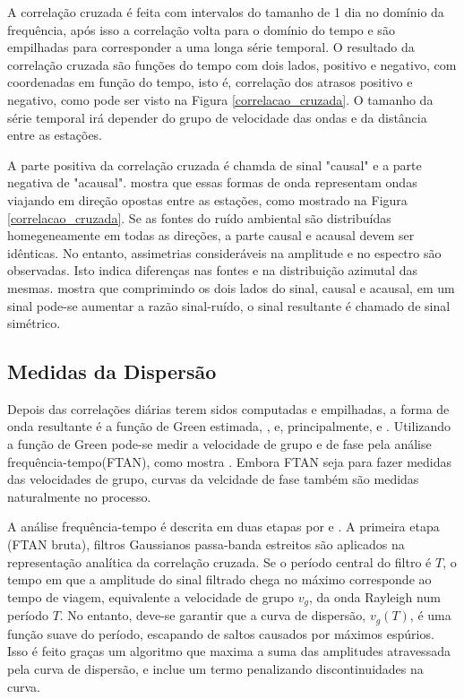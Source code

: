 A correlação cruzada é feita com intervalos do tamanho de 1 dia no domínio da frequência, após isso a correlação volta para o domínio do tempo e são empilhadas para corresponder a uma longa série temporal. 
O resultado da correlação cruzada são funções do tempo com dois lados, positivo e negativo, com coordenadas em função do tempo, isto é, correlação dos atrasos positivo e negativo, como pode ser visto na Figura \ref{correlacao_cruzada}. O tamanho da série temporal irá depender do grupo de velocidade das ondas e da distância entre as estações.

A parte positiva da correlação cruzada é chamda de sinal "causal" e a parte negativa de "acausal". \cite{bensen_processing_2007} mostra que essas formas de onda representam ondas viajando em direção opostas entre as estações, como mostrado na Figura \ref{correlacao_cruzada}. Se as fontes do ruído ambiental são distribuídas homegeneamente em todas as direções, a parte  causal e acausal devem ser idênticas. No entanto, assimetrias consideráveis na amplitude e no espectro são observadas. Isto indica diferenças nas fontes e na distribuição azimutal das mesmas. \cite{bensen_processing_2007} mostra que comprimindo os dois lados do sinal, causal e acausal, em um sinal pode-se aumentar a razão sinal-ruído, o sinal resultante é chamado de sinal simétrico.

\subsection{Medidas da Dispersão}

Depois das correlações diárias terem sidos computadas e empilhadas, a forma de onda resultante é a função de Green estimada, \cite{campillo_long-range_2003}, \cite{shapiro_emergence_2004} e, principalmente, \cite{wapenaar_retrieving_2004} e \cite{bensen_processing_2007}. Utilizando a função de Green pode-se medir a velocidade de grupo e de fase pela análise frequência-tempo(FTAN), como mostra \cite{levshin_automated_2001}. Embora FTAN seja para fazer medidas das velocidades de grupo, curvas da velcidade de fase também são medidas naturalmente no processo.

A análise frequência-tempo é descrita em duas etapas por \cite{levshin_automated_2001} e \cite{bensen_processing_2007}. A primeira etapa (FTAN bruta), filtros Gaussianos passa-banda estreitos são aplicados na representação analítica da correlação cruzada. Se o período central do filtro é $T$, o tempo em que a amplitude do sinal filtrado chega no máximo corresponde ao tempo de viagem, equivalente a velocidade de grupo $v_{g}$, da onda Rayleigh num período $T$. No entanto, deve-se garantir que a curva de dispersão, $v_{g}(T)$, é uma função suave do período, escapando de saltos causados por máximos espúrios. Isso é feito graças um algoritmo que maxima a suma das amplitudes atravessada pela curva de dispersão, e inclue um termo penalizando discontinuidades na curva.

